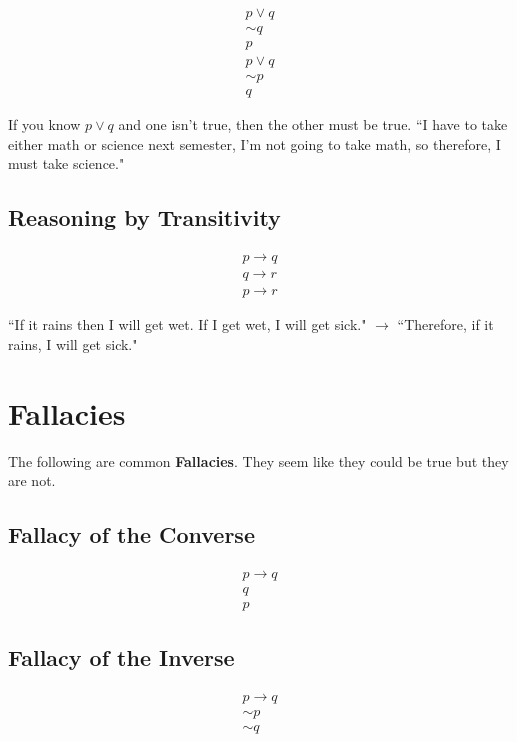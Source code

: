 \documentclass[10pt]{article}
\theoremstyle{definition}
\begin{document}
$$\begin{array}{l}
p\vee q \\
\sim q\\
\hline
p
\end{array}$$
$$\begin{array}{l}
p\vee q \\
\sim p\\
\hline
q
\end{array}$$


If you know $p \vee q$ and one isn't true, then the other must be true.  ``I have to take either math or science next semester, I'm not going to take math, so therefore, I must take science."

\subsection{Reasoning by Transitivity}

$$\begin{array}{l}
p\to q \\
q\to r\\
\hline
p\to r
\end{array}$$

``If it rains then I will get wet.  If I get wet, I will get sick."  $\to $ ``Therefore, if it rains, I will get sick."


\section{Fallacies}

The following are common {\bf Fallacies}.  They seem like they could be true but they are not.

\subsection{Fallacy of the Converse}

$$\begin{array}{l}
p\to q \\
q\\
\hline
p
\end{array}$$



\subsection{Fallacy of the Inverse}

$$\begin{array}{l}
p\to q \\
\sim p\\
\hline
\sim q
\end{array}$$
\end{document}
